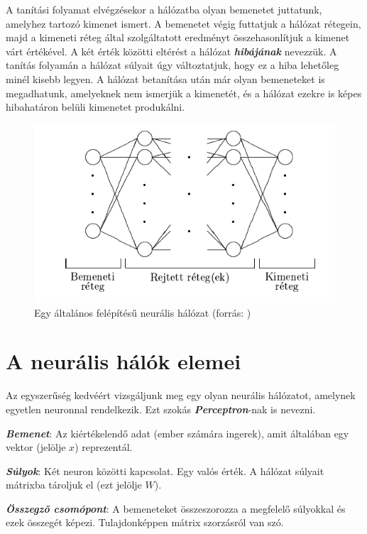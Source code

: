 A tanítási folyamat elvégzésekor a hálózatba olyan bemenetet juttatunk, amelyhez tartozó kimenet ismert. A bemenetet végig futtatjuk a hálózat rétegein, majd a kimeneti réteg által szolgáltatott eredményt összehasonlítjuk a kimenet várt értékével. A két érték közötti eltérést a hálózat \textit{\textbf{hibájának}} nevezzük. A tanítás folyamán a hálózat súlyait úgy változtatjuk, hogy ez a hiba lehetőleg minél kisebb legyen. A hálózat betanítása után már olyan bemeneteket is megadhatunk, amelyeknek nem ismerjük a kimenetét, és a hálózat ezekre is képes hibahatáron belüli kimenetet produkálni.

\begin{figure}[h]
	\centering
	\includegraphics[scale=0.75]{images/ANNLayers.png}
	\caption{Egy általános felépítésű neurális hálózat (forrás: \cite{neuralis77})}
\end{figure}

\section{A neurális hálók elemei}

Az egyszerűség kedvéért vizsgáljunk meg egy olyan neurális hálózatot, amelynek egyetlen neuronnal rendelkezik. Ezt szokás \textbf{\textit{Perceptron}}-nak is nevezni.

\textbf{\textit{Bemenet}}: Az kiértékelendő adat (ember számára ingerek), amit általában egy vektor (jelölje $x$) reprezentál.

\textit{\textbf{Súlyok}}: Két neuron közötti kapcsolat. Egy valós érték. A hálózat súlyait mátrixba tároljuk el (ezt jelölje $W$).

\textbf{\textit{Összegző csomópont}}: A bemeneteket összeszorozza a megfelelő súlyokkal és ezek összegét képezi. Tulajdonképpen mátrix szorzásról van szó.

